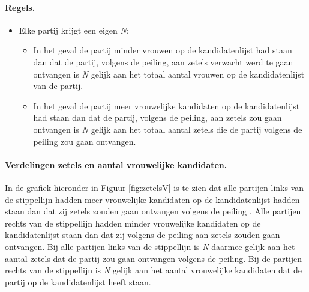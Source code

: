 \paragraph{Regels.}
\begin{itemize}

 		\item
Elke partij krijgt een eigen \textit{N}:
 
		\begin{itemize}
			\item
In het geval de partij minder vrouwen op de kandidatenlijst had staan dan dat de partij, volgens de peiling, aan zetels verwacht werd te gaan ontvangen is \textit{N} gelijk aan het totaal aantal vrouwen op de kandidatenlijst van de partij.
			\item
In het geval de partij meer vrouwelijke kandidaten op de kandidatenlijst had staan dan dat de partij, volgens de peiling, aan zetels zou gaan ontvangen is \textit{N} gelijk aan het totaal aantal zetels die de partij volgens de peiling zou gaan ontvangen.\\	
			
		\end{itemize} 	
\end{itemize} 

\paragraph{Verdelingen zetels en aantal vrouwelijke kandidaten.}
In de grafiek hieronder in Figuur \ref{fig:zetelsV} is te zien dat alle partijen links van de stippellijn hadden meer vrouwelijke kandidaten op de kandidatenlijst \citep{Kiesraad_kandidatenlijsten} hadden staan dan dat zij zetels zouden gaan ontvangen volgens de peiling \citep{IPSOS}. Alle partijen rechts van de stippellijn hadden minder vrouwelijke kandidaten op de kandidatenlijst staan dan dat zij volgens de peiling aan zetels zouden gaan ontvangen. Bij alle partijen links van de stippellijn is \textit{N} daarmee gelijk aan het aantal zetels dat de partij zou gaan ontvangen volgens de peiling. Bij de partijen rechts van de stippellijn is \textit{N} gelijk aan het aantal vrouwelijke kandidaten dat de partij op de kandidatenlijst heeft staan.
 
